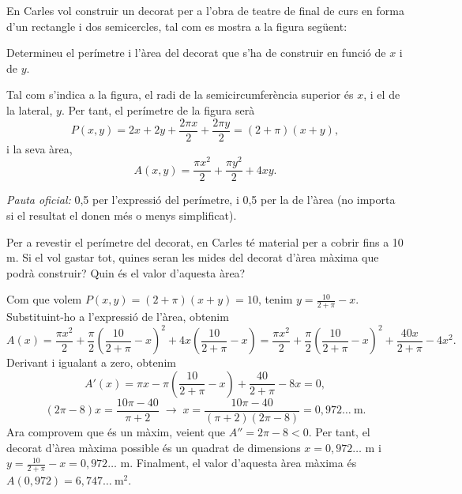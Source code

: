 En Carles vol construir un decorat per a l'obra de teatre de final de curs en forma d'un rectangle i dos
semicercles, tal com es mostra a la figura següent:
\begin{center}
\end{center}

\begin{apartats}

Determineu el perímetre i l'àrea del decorat que s'ha de construir en funció de $x$ i de $y$.

\begin{solucio}
Tal com s'indica a la figura, el radi de la semicircumferència superior és $x$, i el de la lateral, $y$. Per tant,
el perímetre de la figura serà
\[
P(x,y)=2x+2y+\frac{2\pi x}{2}+\frac{2\pi y}{2}=(2+\pi)(x+y),
\]
i la seva àrea,
\[
A(x,y)=\frac{\pi x^2}{2}+\frac{\pi y^2}{2}+4xy .
\]

\textit{Pauta oficial:} 0,5 per l'expressió del perímetre, i 0,5 per la de l'àrea (no importa si el resultat el
donen més o menys simplificat).
\end{solucio}

Per a revestir el perímetre del decorat, en Carles té material per a cobrir fins a 10 m. Si el vol gastar tot,
quines seran les mides del decorat d'àrea màxima que podrà construir? Quin és el valor d'aquesta àrea?

\begin{solucio}
Com que volem $P(x,y)=(2+\pi)(x+y)=10$, tenim $y=\frac{10}{2+\pi}-x$. Substituint-ho a l'expressió de l'àrea,
obtenim
\[
A(x)=\frac{\pi x^2}{2}+\frac\pi2\left(\frac{10}{2+\pi}-x\right)^2+4x\left(\frac{10}{2+\pi}-x\right)
=\frac{\pi x^2}{2}+\frac\pi2\left(\frac{10}{2+\pi}-x\right)^2+\frac{40x}{2+\pi}-4x^2 .
\]
Derivant i igualant a zero, obtenim
\[
A'(x)=\pi x-\pi\left(\frac{10}{2+\pi}-x\right)+\frac{40}{2+\pi}-8x=0,
\]
\[
(2\pi-8)x=\frac{10\pi-40}{\pi+2}\;\rightarrow\;x=\frac{10\pi-40}{(\pi+2)(2\pi-8)}=0{,}972\ldots\ \text{m}.
\]
Ara comprovem que és un màxim, veient que $A''=2\pi-8<0$. Per tant, el decorat d'àrea màxima possible és un
quadrat de dimensions $x=0{,}972\ldots$ m i $y=\frac{10}{2+\pi}-x=0{,}972\ldots$ m. Finalment, el valor d'aquesta
àrea màxima és $A(0{,}972)=6{,}747\ldots\ \text{m}^2$.


\end{solucio}
\end{apartats}
